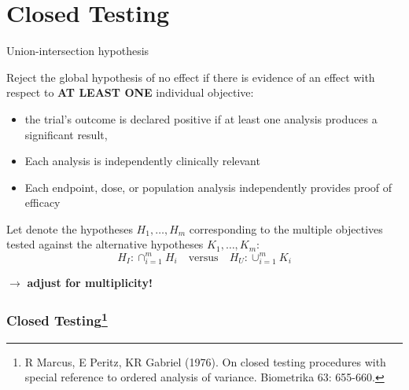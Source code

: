 \documentclass[xcolor={dvipsnames}]{beamer}
\newcommand{\bbf}[1]{\textcolor{black}{\bf #1}}
\newcommand{\rbf}[1]{\textcolor{redUnipd}{ #1}}
\begin{document}
\section{Closed Testing}
\begin{frame}{Union-intersection hypothesis}

Reject the global hypothesis of no effect if there is evidence of an effect with respect to \textbf{\rbf{AT LEAST ONE}} individual objective:

\begin{itemize}
    \item the trial's outcome is declared positive if at least one analysis produces a significant result,
    \item Each analysis is independently clinically relevant
    \item Each endpoint, dose, or population analysis independently provides proof of efficacy
\end{itemize}
\vspace{.5cm}

Let denote the hypotheses $H_1, \dots, H_m$ corresponding to the multiple objectives tested against the alternative hypotheses $K_1, \dots, K_m$:
\begin{equation*}
    \boxed{H_I: \cap_{i = 1}^m H_i \quad \text{versus} \quad H_U: \cup_{i=1}^m K_i}
\end{equation*}

\vspace{.5cm}

$\rightarrow$ \textbf{\rbf{adjust for multiplicity!}}

\end{frame}



\begin{frame}
\frametitle{Closed Testing\footnote{R Marcus, E Peritz, KR Gabriel (1976). On closed testing procedures with special reference to ordered analysis of variance. Biometrika 63: 655-660.}}
\begin{overprint}
\end{overprint}
\begin{center}
\only<1>{\bbf{Initial Hypotheses}}
\only<2>{\bbf{Closed Set}}
\medskip

\end{center}
\end{frame}
\end{document}
